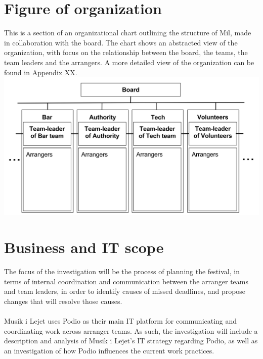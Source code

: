 \section{Figure of organization}
\label{sec:organisation}
This is a section of an organizational chart outlining the structure of Mil, made in collaboration with the board. The chart shows an abstracted view of the organization, with focus on the relationship between the board, the teams, the team leaders and the arrangers. A more detailed view of the organization can be found in Appendix XX.\\
\includegraphics[scale=0.7]{Pictures/MIL_Organisational_chart_Abstract.png}
\section{Business and IT scope}
The focus of the investigation will be the process of planning the festival, in terms of internal coordination and communication between the arranger teams and team leaders, in order to identify causes of missed deadlines, and propose changes that will resolve those causes.
\\ \\
Musik i Lejet uses Podio as their main IT platform for communicating and coordinating work across arranger teams. As such, the investigation will include a description and analysis of Musik i Lejet's IT strategy regarding Podio, as well as an investigation of how Podio influences the current work practices.

